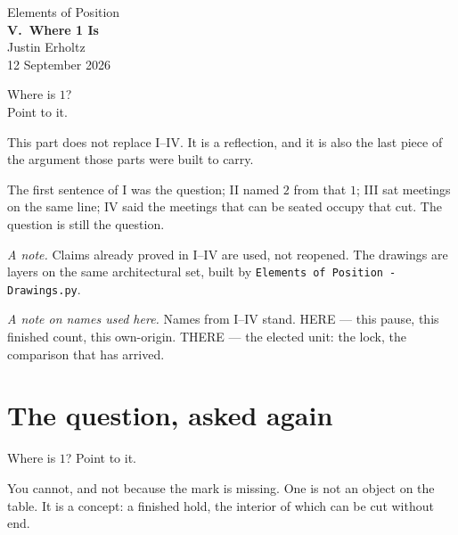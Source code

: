 \documentclass[10pt,a4paper]{article}
\theoremstyle{plain}
\theoremstyle{definition}
\begin{document}
\begin{center}
\vspace*{2.2em}
{\large Elements of Position}\\[1.6em]
{\LARGE\bfseries V.\ Where 1 Is}\\[2.2em]
{\normalsize Justin Erholtz}\\[0.35em]
{\small 12 September 2026}
\end{center}

\vspace{2.4em}

\begin{center}
{\large Where is \(1\)?}\\[0.35em]
{\large Point to it.}
\end{center}

\vspace{1.8em}

\noindent
This part does not replace I--IV.
It is a reflection, and it is also the last piece of the argument those parts were built to carry.

The first sentence of I was the question; II named $2$ from that $1$; III sat meetings on the same line; IV said the meetings that can be seated occupy that cut.
The question is still the question.

\vspace{1.4em}

\noindent
\textit{A note.}
Claims already proved in I--IV are used, not reopened.
The drawings are layers on the same architectural set, built by \texttt{Elements of Position - Drawings.py}.

\vspace{0.9em}
\noindent
\textit{A note on names used here.}
Names from I--IV stand.
HERE --- this pause, this finished count, this own-origin.
THERE --- the elected unit: the lock, the comparison that has arrived.

\newpage
\tableofcontents
\newpage

\section{The question, asked again}

Where is $1$?
Point to it.

You cannot, and not because the mark is missing.
One is not an object on the table.
It is a concept: a finished hold, the interior of which can be cut without end.
\end{document}
